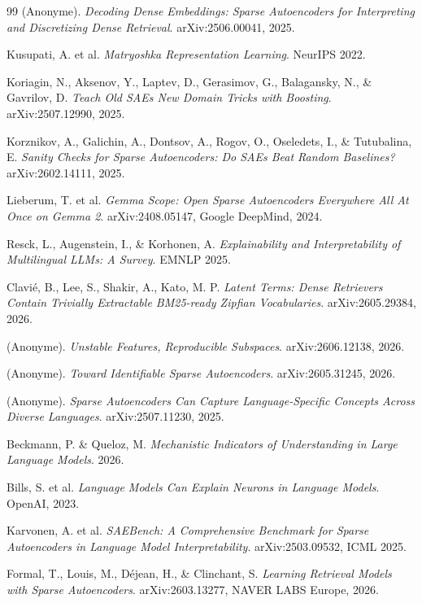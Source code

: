 \documentclass[11pt]{article}
\begin{document}
\begin{thebibliography}{99}
  (Anonyme).
  \textit{Decoding Dense Embeddings: Sparse Autoencoders for Interpreting and Discretizing Dense Retrieval}.
  arXiv:2506.00041, 2025.

  Kusupati, A. et al.
  \textit{Matryoshka Representation Learning}.
  NeurIPS 2022.

  Koriagin, N., Aksenov, Y., Laptev, D., Gerasimov, G., Balagansky, N., \& Gavrilov, D.
  \textit{Teach Old SAEs New Domain Tricks with Boosting}.
  arXiv:2507.12990, 2025.

  Korznikov, A., Galichin, A., Dontsov, A., Rogov, O., Oseledets, I., \& Tutubalina, E.
  \textit{Sanity Checks for Sparse Autoencoders: Do SAEs Beat Random Baselines?}
  arXiv:2602.14111, 2025.

  Lieberum, T. et al.
  \textit{Gemma Scope: Open Sparse Autoencoders Everywhere All At Once on Gemma 2}.
  arXiv:2408.05147, Google DeepMind, 2024.

  Resck, L., Augenstein, I., \& Korhonen, A.
  \textit{Explainability and Interpretability of Multilingual LLMs: A Survey}.
  EMNLP 2025.

  Clavié, B., Lee, S., Shakir, A., Kato, M. P.
  \textit{Latent Terms: Dense Retrievers Contain Trivially Extractable BM25-ready Zipfian Vocabularies}.
  arXiv:2605.29384, 2026.

  (Anonyme).
  \textit{Unstable Features, Reproducible Subspaces}.
  arXiv:2606.12138, 2026.

  (Anonyme).
  \textit{Toward Identifiable Sparse Autoencoders}.
  arXiv:2605.31245, 2026.

  (Anonyme).
  \textit{Sparse Autoencoders Can Capture Language-Specific Concepts Across Diverse Languages}.
  arXiv:2507.11230, 2025.

  Beckmann, P. \& Queloz, M.
  \textit{Mechanistic Indicators of Understanding in Large Language Models}.
  2026.

  Bills, S. et al.
  \textit{Language Models Can Explain Neurons in Language Models}.
  OpenAI, 2023.

  Karvonen, A. et al.
  \textit{SAEBench: A Comprehensive Benchmark for Sparse Autoencoders in
  Language Model Interpretability}.
  arXiv:2503.09532, ICML 2025.

  Formal, T., Louis, M., Déjean, H., \& Clinchant, S.
  \textit{Learning Retrieval Models with Sparse Autoencoders}.
  arXiv:2603.13277, NAVER LABS Europe, 2026.

\end{thebibliography}
\end{document}
